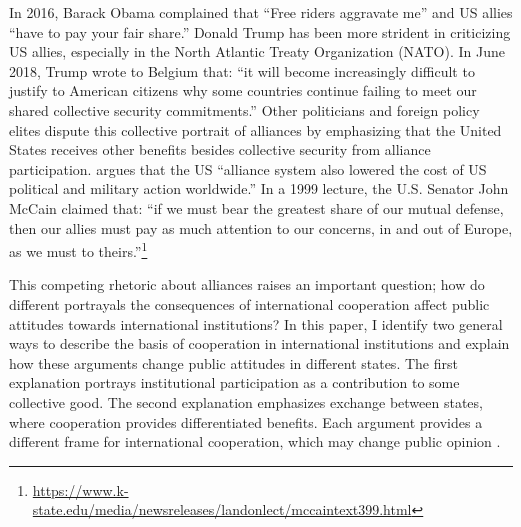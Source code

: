 \documentclass[12pt]{article}
\begin{document}
In 2016, Barack Obama complained that ``Free riders aggravate me'' and US allies ``have to pay your fair share.'' 
Donald Trump has been more strident in criticizing US allies, especially in the North Atlantic Treaty Organization (NATO). 
In June 2018, Trump wrote to Belgium that: ``it will become increasingly difficult to justify to American citizens why some countries continue failing to meet our shared collective security commitments.''
Other politicians and foreign policy elites dispute this collective portrait of alliances by emphasizing that the United States receives other benefits besides collective security from alliance participation. 
\citet[pg. 129]{RappHooper2020} argues that the US ``alliance system also lowered the cost of US political and military action worldwide.'' 
In a 1999 lecture, the U.S. Senator John McCain claimed that: ``if we must bear the greatest share of our mutual defense, then our allies must pay as much attention to our concerns, in and out of Europe, as we must to theirs.''\footnote{\url{https://www.k-state.edu/media/newsreleases/landonlect/mccaintext399.html}} 


This competing rhetoric about alliances raises an important question; how do different portrayals the consequences of international cooperation affect public attitudes towards international institutions? 
In this paper, I identify two general ways to describe the basis of cooperation in international institutions and explain how these arguments change public attitudes in different states. 
The first explanation portrays institutional participation as a contribution to some collective good. 
The second explanation emphasizes exchange between states, where cooperation provides differentiated benefits.
Each argument provides a different frame for international cooperation, which may change public opinion \citep{ChongDruckman2007}.  
\end{document}
